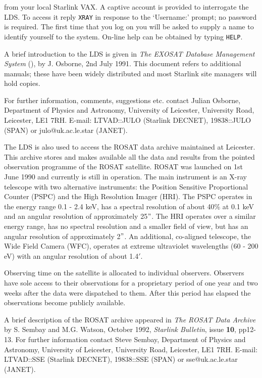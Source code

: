 \documentclass[twoside,11pt,nolof]{starlink}
\begin{document}
from your local Starlink VAX. A captive account is provided to
interrogate the LDS. To access it reply \verb-XRAY- in response to the
`Username:' prompt; no password is required. The first time that you log
on you will be asked to supply a name to identify yourself to the
system. On-line help can be obtained by typing \verb-HELP-.

A brief introduction to the LDS is given in \textit{The EXOSAT Database
Management System}
\newline
(), by J. Osborne, 2nd July 1991. This document refers
to additional manuals; these have been widely distributed and most
Starlink site managers will hold copies.

For further information, comments, suggestions etc. contact Julian
Osborne, Department of Physics and Astronomy, University of Leicester,
University Road, Leicester, LE1 7RH. E-mail: LTVAD::JULO (Starlink
DECNET), 19838::JULO (SPAN) or julo@uk.ac.le.star (JANET).

The LDS is also used to access the ROSAT data archive maintained at
Leicester. This archive stores and makes available all the data and
results from the pointed observation programme of the ROSAT satellite.
ROSAT was launched on 1st June 1990 and currently is still in operation.
The main instrument is an X-ray telescope with two alternative
instruments: the Position Sensitive Proportional Counter (PSPC) and the
High Resolution Imager (HRI). The PSPC operates in the energy range
0.1 - 2.4 keV, has a spectral resolution of about 40\% at 0.1 keV and an
angular resolution of approximately 25$"$. The HRI operates over a
similar energy range, has no spectral resolution and a smaller field of
view, but has an angular resolution of approximately 2$"$. An
additional, co-aligned telescope, the Wide Field Camera (WFC), operates
at extreme ultraviolet wavelengths (60 - 200 eV) with an angular
resolution of about 1.4$'$.

Observing time on the satellite is allocated to individual observers.
Observers have sole access to their observations for a proprietary
period of one year and two weeks after the data were dispatched to them.
After this period has elapsed the observations become publicly
available.

A brief description of the ROSAT archive appeared in \textit{The ROSAT
Data Archive} by S. Sembay and M.G. Watson, October 1992, \textit{Starlink Bulletin}, issue \textbf{10}, pp12-13. For further information
contact Steve Sembay, Department of Physics and Astronomy, University
of Leicester, University Road, Leicester, LE1 7RH. E-mail: LTVAD::SSE
(Starlink DECNET), 19838::SSE (SPAN) or sse@uk.ac.le.star (JANET).
\end{document}
